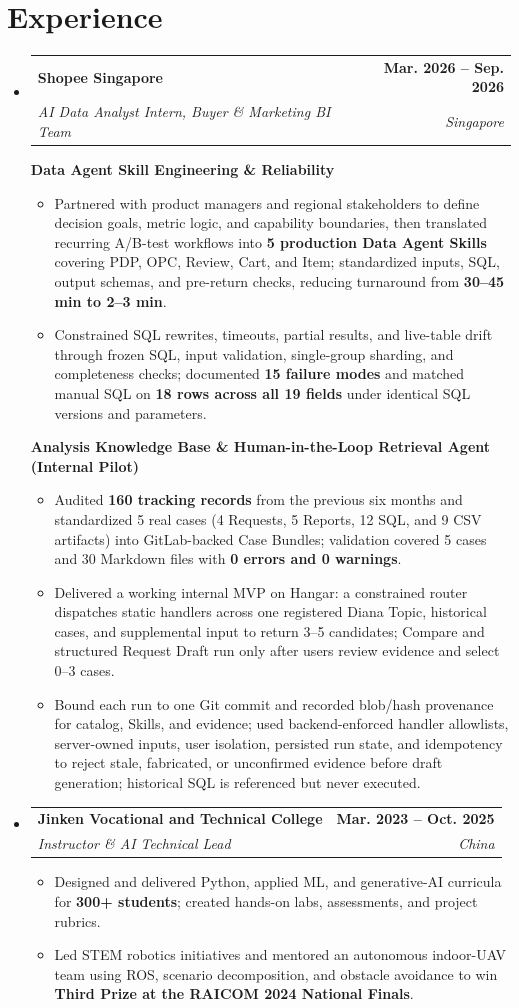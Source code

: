 \documentclass[letterpaper,10pt]{article}
\makeatletter
\newcommand{\resumeItem}[1]{
  \item\small{{#1 \vspace{-3pt}}}
}
\newcommand{\resumeSubheading}[4]{
  \vspace{-2pt}\item
    \begin{tabular*}{1.0\textwidth}[t]{l@{\extracolsep{\fill}}r}
      \textbf{#1} & \textbf{\small #2} \\
      \textit{\small #3} & \textit{\small #4} \\
    \end{tabular*}\vspace{-7pt}
}
\newcommand{\resumeExperienceProject}[1]{
  \par\vspace{2pt}\noindent\small\textbf{#1}\par\vspace{-2pt}
}
\newcommand{\resumeSubHeadingListStart}{\begin{itemize}[leftmargin=0.0in,label={}]}
\newcommand{\resumeSubHeadingListEnd}{\end{itemize}}
\newcommand{\resumeItemListStart}{\begin{itemize}[leftmargin=0.16in]}
\newcommand{\resumeItemListEnd}{\end{itemize}\vspace{-7pt}}
\makeatother
\begin{document}
\section{Experience}
\resumeSubHeadingListStart
  \resumeSubheading
    {Shopee Singapore}{Mar. 2026 -- Sep. 2026}
    {AI Data Analyst Intern, Buyer \& Marketing BI Team}{Singapore}
    \par\vspace{8pt}
    \resumeExperienceProject{Data Agent Skill Engineering \& Reliability}
    \resumeItemListStart
      \resumeItem{Partnered with product managers and regional stakeholders to define decision goals, metric logic, and capability boundaries, then translated recurring A/B-test workflows into \textbf{5 production Data Agent Skills} covering PDP, OPC, Review, Cart, and Item; standardized inputs, SQL, output schemas, and pre-return checks, reducing turnaround from \textbf{30--45 min to 2--3 min}.}
      \resumeItem{Constrained SQL rewrites, timeouts, partial results, and live-table drift through frozen SQL, input validation, single-group sharding, and completeness checks; documented \textbf{15 failure modes} and matched manual SQL on \textbf{18 rows across all 19 fields} under identical SQL versions and parameters.}
    \resumeItemListEnd
    \resumeExperienceProject{Analysis Knowledge Base \& Human-in-the-Loop Retrieval Agent (Internal Pilot)}
    \resumeItemListStart
      \resumeItem{Audited \textbf{160 tracking records} from the previous six months and standardized 5 real cases (4 Requests, 5 Reports, 12 SQL, and 9 CSV artifacts) into GitLab-backed Case Bundles; validation covered 5 cases and 30 Markdown files with \textbf{0 errors and 0 warnings}.}
      \resumeItem{Delivered a working internal MVP on Hangar: a constrained router dispatches static handlers across one registered Diana Topic, historical cases, and supplemental input to return 3--5 candidates; Compare and structured Request Draft run only after users review evidence and select 0--3 cases.}
      \resumeItem{Bound each run to one Git commit and recorded blob/hash provenance for catalog, Skills, and evidence; used backend-enforced handler allowlists, server-owned inputs, user isolation, persisted run state, and idempotency to reject stale, fabricated, or unconfirmed evidence before draft generation; historical SQL is referenced but never executed.}
    \resumeItemListEnd

  \resumeSubheading
    {Jinken Vocational and Technical College}{Mar. 2023 -- Oct. 2025}
    {Instructor \& AI Technical Lead}{China}
    \resumeItemListStart
      \resumeItem{Designed and delivered Python, applied ML, and generative-AI curricula for \textbf{300+ students}; created hands-on labs, assessments, and project rubrics.}
      \resumeItem{Led STEM robotics initiatives and mentored an autonomous indoor-UAV team using ROS, scenario decomposition, and obstacle avoidance to win \textbf{Third Prize at the RAICOM 2024 National Finals}.}
    \resumeItemListEnd
\resumeSubHeadingListEnd
\vspace{-11pt}
\end{document}

